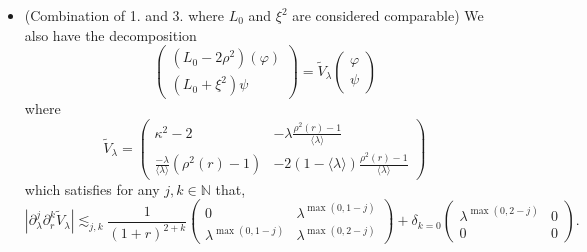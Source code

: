 \documentclass[10pt,a4paper]{amsart}
\begin{document}
\begin{lem}
\begin{itemize}
\item[4)] (Combination of 1. and 3. where $L_0$ and $\xi^2$ are considered comparable) We
  also have the decomposition
  \[ \left(\begin{array}{c}
       (L_0 - 2 \rho^2) (\varphi)\\
       (L_0 + \xi^2) \psi
     \end{array}\right) = \widetilde{V}_{\lambda} \left(\begin{array}{c}
       \varphi\\
       \psi
     \end{array}\right) \]
  where
  \[ \widetilde{V}_{\lambda} = \left(\begin{array}{cc}
       \kappa^2 - 2 & - \lambda \frac{\rho^2 (r) - 1}{\langle \lambda
       \rangle}\\
       \frac{- \lambda}{\langle \lambda \rangle} (\rho^2 (r) - 1) & - 2 (1 -
       \langle \lambda \rangle) \frac{\rho^2 (r) - 1}{\langle \lambda \rangle}
     \end{array}\right) \]
  which satisfies for any $j, k \in \mathbb{N}$ that,
  \[ | \partial_{\lambda}^j \partial_r^k \widetilde{V}_{\lambda} | \lesssim_{j, k}
     \frac{1}{(1 + r)^{2 + k}} \left(\begin{array}{cc}
       0 & \lambda^{\max (0, 1 - j)}\\
       \lambda^{\max (0, 1 - j)} & \lambda^{\max (0, 2 - j)}
     \end{array}\right) + \delta_{k = 0} \left(\begin{array}{cc}
       \lambda^{\max (0, 2 - j)} & 0\\
       0 & 0
     \end{array}\right) . \]
\end{itemize}
\end{lem}
\end{document}
